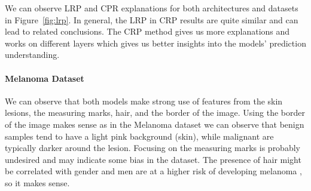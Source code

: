 \documentclass[twoside,11pt]{article}
\begin{document}
We can observe LRP and CPR explanations for both architectures and datasets in Figure~\ref{fig:lrp}. In general, the LRP in CRP results are quite similar and can lead to related conclusions. The CRP method gives us more explanations and works on different layers which gives us better insights into the models' prediction understanding.

\paragraph{Melanoma Dataset}
We can observe that both models make strong use of features from the skin lesions, the measuring marks, hair, and the border of the image.
Using the border of the image makes sense as in the Melanoma dataset we can observe that benign samples tend to have a light pink background (skin), while malignant are typically darker around the lesion.
Focusing on the measuring marks is probably undesired and may indicate some bias in the dataset.
The presence of hair might be correlated with gender and men are at a higher risk of developing melanoma \citep{rastrelli2014melanoma}, so it makes sense.



\end{document}
